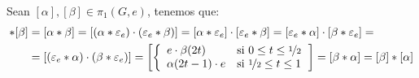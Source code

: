 \begin{ejercicio}
\begin{enumerate}[label=\alph*)]
            Sean $[\alpha],[\beta]\in \pi_1(G,e)$, tenemos que:
            \begin{align*}
                [\alpha]\ast[\beta] &= [\alpha\ast \beta] = [(\alpha\ast \varepsilon_e)\cdot (\varepsilon_e\ast \beta)] = [\alpha\ast \varepsilon_e] \cdot [\varepsilon_e\ast \beta]=  [\varepsilon_e\ast \alpha] \cdot [\beta\ast\varepsilon_e] 
                =\\&= [(\varepsilon_e\ast \alpha)\cdot (\beta\ast \varepsilon_e)]
                = \left[ \left\{\begin{array}{ll}
                                         e\cdot \beta(2t)& \text{si\ } 0\leq t \leq \nicefrac{1}{2} \\
                                         \alpha(2t-1)\cdot e& \text{si\ } \nicefrac{1}{2}\leq t \leq 1
                             \end{array}\right.  \right] = [\beta\ast \alpha] = [\beta]\ast [\alpha]
            \end{align*}
    \end{enumerate}
\end{ejercicio}

